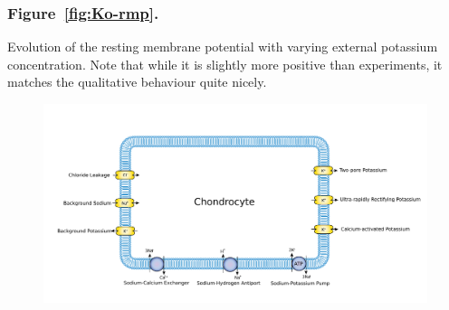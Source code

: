 \subsubsection*{Figure~\ref{fig:Ko-rmp}.}
Evolution of the resting membrane potential with varying external
potassium concentration. Note that while it is slightly more positive
than experiments, it matches the qualitative behaviour quite nicely.

\setlength{\textwidth}{18cm}
\setlength{\oddsidemargin}{0in}
\setlength{\evensidemargin}{0in}

\clearpage
\begin{landscape}
\begin{figure}
  \centering
  \includegraphics[width=\textwidth]
  {../images/pdf/chondrocyte-model-cellml}
  \caption{}
  \label{fig:chondrocyte-model}
\end{figure}
\end{landscape}

